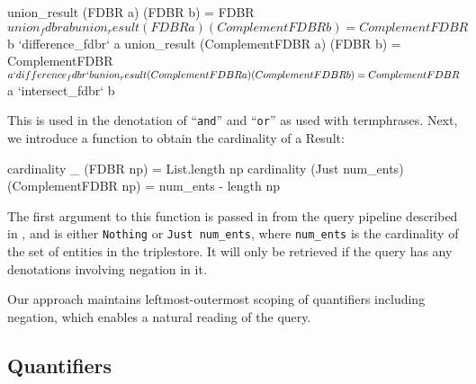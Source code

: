 \documentclass[../main.tex]{subfiles}
\begin{document}
\begin{refsection}
\begin{code}
    union_result (FDBR a) (FDBR b)
      = FDBR $ union_fdbr a b
    union_result (FDBR a) (ComplementFDBR b)
      = ComplementFDBR $ b `difference_fdbr` a
    union_result (ComplementFDBR a) (FDBR b)
      = ComplementFDBR $ a `difference_fdbr` b
    union_result (ComplementFDBR a) (ComplementFDBR b)
      = ComplementFDBR $ a `intersect_fdbr` b
\end{code}
This is used in the denotation of ``\texttt{and}'' and ``\texttt{or}'' as used with termphrases.
Next, we introduce a function to obtain the cardinality of a Result:
\begin{code}
    cardinality _ (FDBR np) = List.length np
    cardinality (Just num_ents) (ComplementFDBR np)
    = num_ents - length np
\end{code}

The first argument to this function is passed in from the query pipeline described in \cite{peelar2020webistjournal}, and is either \texttt{Nothing} or \texttt{Just num\_ents}, where
\texttt{num\_ents} is the cardinality of the set of entities in the triplestore.  It will only be retrieved if the query has any denotations involving negation in it.

Our approach maintains leftmost-outermost scoping of quantifiers including negation, which enables a natural reading of the query.

\subsection{Quantifiers}
\label{subsec:quantifiers}


\end{refsection}
\end{document}
